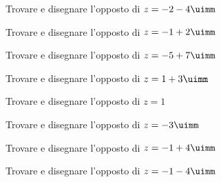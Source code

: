 %
\begin{exercise}[no solution]
	Trovare e disegnare l'opposto di $z=-2-4\uimm$
\end{exercise}
\begin{exercise}[no solution]
	Trovare e disegnare l'opposto di $z=-1+2\uimm$
\end{exercise}
\begin{exercise}[no solution]
	Trovare e disegnare l'opposto di  $z=-5+7\uimm$
\end{exercise}
\begin{exercise}[no solution]
	Trovare e disegnare l'opposto di  $z=1+3\uimm$
\end{exercise}
\begin{exercise}[no solution]
	Trovare e disegnare l'opposto di  $z=1$
\end{exercise}
\begin{exercise}[no solution]
	Trovare e disegnare l'opposto di  $z=-3\uimm$
\end{exercise}
\begin{exercise}[no solution]
	Trovare e disegnare l'opposto di  $z=-1+4\uimm$
\end{exercise}
\begin{exercise}[no solution]
	Trovare e disegnare l'opposto di  $z=-1-4\uimm$
\end{exercise}
 